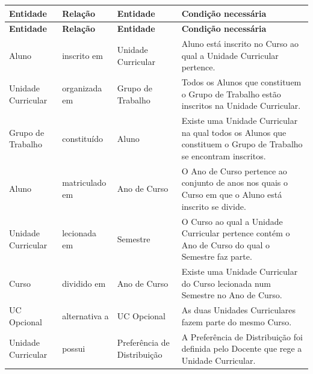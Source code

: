 \documentclass[12pt, a4paper]{article}
\begin{document}
\begin{longtable}{|>{\centering}m{2.5cm}
                  |>{\centering}m{2.5cm}
                  |>{\centering}m{2.5cm}
                  |m{8cm}|}
    \hline
    \textbf{Entidade} & \textbf{Relação} & \textbf{Entidade} & \textbf{Condição necessária} \\
    \hline
    \endfirsthead

    \hline
    \textbf{Entidade} & \textbf{Relação} & \textbf{Entidade} & \textbf{Condição necessária} \\
    \hline
    \endhead

    Aluno              &
    inscrito em        &
    Unidade Curricular &
    Aluno está inscrito no Curso ao qual a Unidade Curricular pertence. \\

    \hline
    Unidade Curricular &
    organizada em      &
    Grupo de Trabalho  &
    Todos os Alunos que constituem o Grupo de Trabalho estão inscritos na Unidade Curricular. \\

    \hline
    Grupo de Trabalho &
    constituído       &
    Aluno             &
    Existe uma Unidade Curricular na qual todos os Alunos que constituem o Grupo de Trabalho se
    encontram inscritos. \\

    \hline
    Aluno          &
    matriculado em &
    Ano de Curso   &
    O Ano de Curso pertence ao conjunto de anos nos quais o Curso em que o Aluno está inscrito se
    divide. \\

    \hline
    Unidade Curricular &
    lecionada em       &
    Semestre           &
    O Curso ao qual a Unidade Curricular pertence contém o Ano de Curso do qual o Semestre faz
    parte. \\

    \hline
    Curso        &
    dividido em  &
    Ano de Curso &
    Existe uma Unidade Curricular do Curso lecionada num Semestre no Ano de Curso. \\

    \hline
    UC Opcional   &
    alternativa a &
    UC Opcional   &
    As duas Unidades Curriculares fazem parte do mesmo Curso. \\

    \hline
    Unidade Curricular          &
    possui                      &
    Preferência de Distribuição &
    A Preferência de Distribuição foi definida pelo Docente que rege a Unidade Curricular. \\


\end{longtable}
\end{document}
